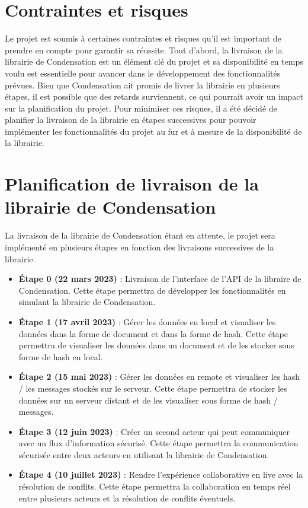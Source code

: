 \section*{Contraintes et risques}
Le projet est soumis à certaines contraintes et risques qu'il est important de prendre en compte pour garantir sa réussite.
Tout d'abord, la livraison de la librairie de Condensation est un élément clé du projet et sa disponibilité en temps voulu est essentielle pour avancer dans le développement des fonctionnalités prévues. 
Bien que Condensation ait promis de livrer la librairie en plusieurs étapes, il est possible que des retards surviennent, ce qui pourrait avoir un impact sur la planification du projet.
Pour minimiser ces risques, il a été décidé de planifier la livraison de la librairie en étapes successives pour pouvoir implémenter les fonctionnalités du projet au fur et à mesure de la disponibilité de la librairie.

\section*{Planification de livraison de la librairie de Condensation}
La livraison de la librairie de Condensation étant en attente, le projet sera implémenté en plusieurs étapes en fonction des livraisons successives de la librairie.
\begin{itemize}
    \item \textbf{Étape 0 (22 mars 2023)} : Livraison de l'interface de l'API de la libraire de Condensation. Cette étape permettra de développer les fonctionnalités en simulant la librairie de Condensation.
    \item \textbf{Étape 1 (17 avril 2023)} : Gérer les données en local et visualiser les données dans la forme de document et dans la forme de hash. Cette étape permettra de visualiser les données dans un document et de les stocker sous forme de hash en local.
    \item \textbf{Étape 2 (15 mai 2023)} : Gérer les données en remote et visualiser les hash / les messages stockés sur le serveur. Cette étape permettra de stocker les données sur un serveur distant et de les visualiser sous forme de hash / messages.
    \item \textbf{Étape 3 (12 juin 2023)} : Créer un second acteur qui peut communiquer avec un flux d'information sécurisé. Cette étape permettra la communication sécurisée entre deux acteurs en utilisant la librairie de Condensation.
    \item \textbf{Étape 4 (10 juillet 2023)} : Rendre l'expérience collaborative en live avec la résolution de conflits. Cette étape permettra la collaboration en temps réel entre plusieurs acteurs et la résolution de conflits éventuels.
\end{itemize}